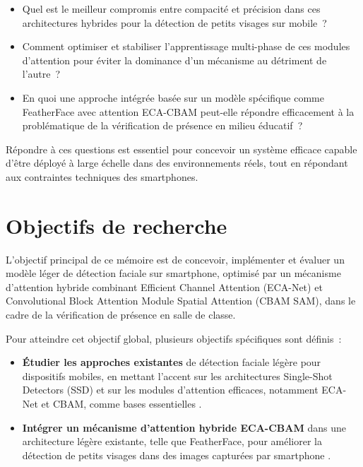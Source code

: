 \begin{onehalfspace}
\begin{itemize}
\item Quel est le meilleur compromis entre compacité et précision dans ces architectures hybrides pour la détection de petits visages sur mobile~?
\item Comment optimiser et stabiliser l'apprentissage multi-phase de ces modules d'attention pour éviter la dominance d'un mécanisme au détriment de l'autre~?
\item En quoi une approche intégrée basée sur un modèle spécifique comme FeatherFace avec attention ECA-CBAM peut-elle répondre efficacement à la problématique de la vérification de présence en milieu éducatif~?
\end{itemize}

\hspace{0.65 cm}Répondre à ces questions est essentiel pour concevoir un système efficace capable d'être déployé à large échelle dans des environnements réels, tout en répondant aux contraintes techniques des smartphones.

\section{Objectifs de recherche}

\hspace{0.65 cm}L'objectif principal de ce mémoire est de concevoir, implémenter et évaluer un modèle léger de détection faciale sur smartphone, optimisé par un mécanisme d'attention hybride combinant Efficient Channel Attention (ECA-Net) et Convolutional Block Attention Module Spatial Attention (CBAM SAM), dans le cadre de la vérification de présence en salle de classe.

\hspace{0.65 cm}Pour atteindre cet objectif global, plusieurs objectifs spécifiques sont définis~:

\begin{itemize}
\item \textbf{Étudier les approches existantes} de détection faciale légère pour dispositifs mobiles, en mettant l'accent sur les architectures Single-Shot Detectors (SSD) et sur les modules d'attention efficaces, notamment ECA-Net et CBAM, comme bases essentielles \cite{Wang2020ECANet, Woo2018CBAM, Kim2025FeatherFace}.

\item \textbf{Intégrer un mécanisme d'attention hybride ECA-CBAM} dans une architecture légère existante, telle que FeatherFace, pour améliorer la détection de petits visages dans des images capturées par smartphone \cite{Kim2025FeatherFace, Wang2024ECACBAM}.


\end{itemize}
\end{onehalfspace}

